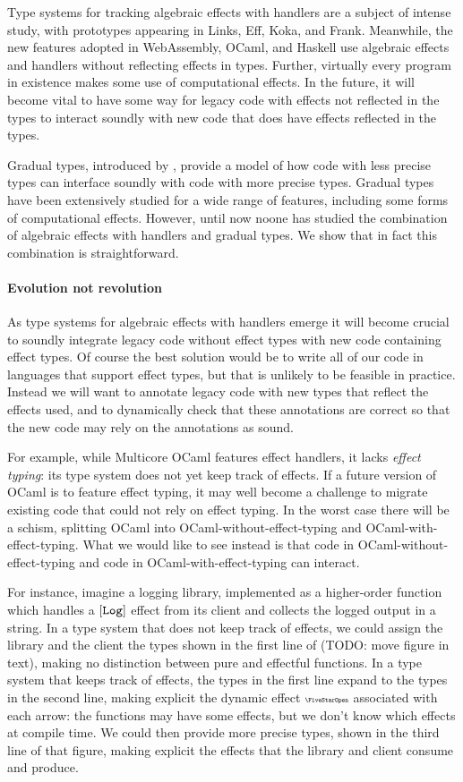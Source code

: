 Type systems for tracking algebraic effects with handlers are a subject of intense study,
with prototypes appearing in Links, Eff, Koka, and Frank.
Meanwhile, the new features adopted in WebAssembly, OCaml, and Haskell
use algebraic effects and handlers without reflecting effects in types.
Further, virtually every program in existence makes some use of computational
effects. In the future, it will become vital to have some way for legacy
code with effects not reflected in the types to interact soundly with
new code that does have effects reflected in the types.

Gradual types, introduced by \citet{siek-taha-2006},
provide a model of how code with less precise types can interface soundly with
code with more precise types. Gradual types have been extensively studied for a wide
range of features, including some forms of computational effects. However,
until now noone has studied the combination of algebraic effects
with handlers and gradual types. We show that in fact this combination
is straightforward.

\paragraph{Evolution not revolution}
As type systems for algebraic effects with handlers emerge
it will become crucial to soundly integrate legacy code without effect types
with new code containing effect types. Of course the best solution would be
to write all of our code in languages that support effect types,
but that is unlikely to be feasible in practice.
Instead we will want to annotate legacy code with new types that reflect
the effects used, and to dynamically check that these annotations
are correct so that the new code may rely on the annotations as sound.

For example,
while Multicore OCaml features effect handlers, it lacks \emph{effect typing}:
its type system does not yet keep track of effects.
If a future version of OCaml is to feature effect typing,
it may well become a challenge to migrate existing code that could
not rely on effect typing. In the worst case there will be a
schism, splitting OCaml into OCaml-without-effect-typing and
OCaml-with-effect-typing. What we would like to see instead
is that code in OCaml-without-effect-typing and
code in OCaml-with-effect-typing can interact.

For instance, imagine a logging library, implemented as a higher-order function
which handles a ${[\texttt{Log}]}$ effect from its client and collects the logged output
in a string. In a type system that does not keep track of effects, we could assign the
library and the client the types shown in the first line of
(TODO: move figure in text), making no distinction between pure and effectful
functions.
In a type system that keeps track of effects, the types in the first line
expand to the types in the second line, making explicit the dynamic effect $\effany$
associated with each arrow: the functions may have some effects, but we
don't know which effects at compile time.
We could then provide more precise types,
shown in the third line of that figure,
making explicit the effects that the library and client consume and produce.

